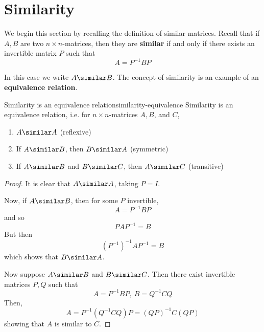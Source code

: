 \section{Similarity}

We begin this section by recalling the definition  of similar matrices.
Recall that if $A,B$ are two $n\times n$-matrices, then they are \textbf{similar}
if and only if there exists an invertible matrix $P$
such that
\begin{equation*}
A=P^{-1}BP
\end{equation*}

In this case we write $A\similar B$. The concept of similarity is an example of an \textbf{equivalence relation}.

\begin{lemma}{Similarity is an equivalence relation}{similarity-equivalence}
Similarity is an equivalence relation, i.e. for $n \times n$-matrices $A,B$, and $C$,
\begin{enumerate}
\item $A \similar A$ (reflexive)
\item If $A \similar B$, then $B \similar A$ (symmetric)
\item If $A \similar B$ and $B \similar C$, then $A \similar C$ (transitive)
\end{enumerate}
\end{lemma}

\begin{proof}
It is clear that $A\similar A$, taking $P=I$.

Now, if $A\similar B$, then for some $P$ invertible,
\begin{equation*}
A=P^{-1}BP
\end{equation*}
and so
\begin{equation*}
PAP^{-1}=B
\end{equation*}
But then
\begin{equation*}
(P^{-1}) ^{-1}AP^{-1}=B
\end{equation*}
which shows that $B\similar A$.

Now suppose $A\similar B$ and $B\similar C$. Then there exist invertible matrices
$P,Q$ such that
\begin{equation*}
A=P^{-1}BP,\ B=Q^{-1}CQ
\end{equation*}
Then,
\begin{equation*}
A=P^{-1} (Q^{-1}CQ)P=(QP) ^{-1}C(QP)
\end{equation*}
showing that $A$ is similar to $C$.
\end{proof}

